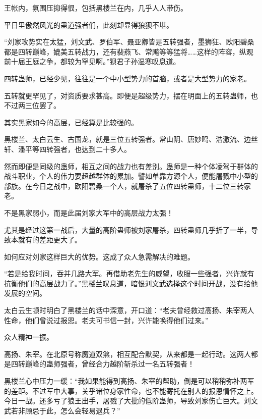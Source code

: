 
\begin{this_body}

王帐内，氛围压抑得很，包括黑楼兰在内，几乎人人带伤。

平日里傲然风光的蛊道强者们，此刻却显得狼狈不堪。

“刘家攻势实在太猛，刘文武、罗伯军、聂亚卿皆是五转强者，墨狮狂、欧阳碧桑都是四转巅峰，媲美五转战力，还有裴燕飞、常飚等等猛将……这样的阵容，纵观前十届王庭之争，都较为罕见啊。”狈君子孙湿寒叹息道。

四转蛊师，已经少见，往往是一个中小型势力的首脑，或者是大型势力的家老。

五转就更罕见了，对资质要求甚高。即便是超级势力，摆在明面上的五转蛊师，也不过两三位罢了。

其实黑家如今的高层，已经算是比较强的。

黑楼兰、太白云生、古国龙，就是三位五转强者。常山阴、唐妙鸣、浩激流、边丝轩、潘平等四转强者，也达到二十多人。

然而即便是同级的蛊师，相互之间的战力也有差别。蛊师是一种个体凌驾于群体的战斗职业，个人的伟力要超越群体的累加。譬如单靠方源个人，便能屠戮中小型的部族。在今日之战中，欧阳碧桑一个人，就屠杀了五位四转蛊师，十二位三转家老。

不是黑家弱小，而是此届刘家大军中的高层战力太强！

尤其是经过这第一战后，大量的高阶蛊师被刘家屠杀，四转蛊师几乎折了一半，导致本就有的差距更大了。

如何应对刘家这样巨大的优势。这成了众人急需解决的难题。

“若是给我时间，吞并几路大军。再借助老先生的威望，收服一些强者，兴许就有抗衡他们的高层战力了。”黑楼兰叹息道，暗恨刘文武选择这个时间开战，没有给他发展的空间。

太白云生顿时明白了黑楼兰的话中深意，开口道：“老夫曾经救过高扬、朱宰两人性命，他们曾说过报恩。老夫可书信一封，兴许能唤得他们过来。”

众人精神一振。

高扬、朱宰。在北原号称魔道双煞，相互配合默契，从来都是一起行动。这两人都是四转巅峰的蛊师强者，曾经合力越阶斩杀过一名五转强者！

黑楼兰心中压力一缓：“我如果能得到高扬、朱宰的帮助，倒是可以稍稍弥补两军的差距。不过军中大事，关乎诸位身家性命，也不能寄托在别人的报恩情怀之上。今日一战。还多亏了狼王出手，屠戮了大批的低阶蛊师，导致刘家伤亡巨大。刘文武若非顾忌于此，怎么会轻易退兵？”


\end{this_body}
